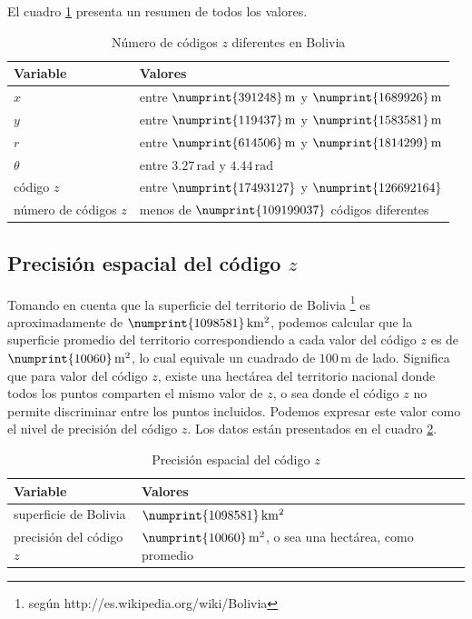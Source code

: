 \documentclass[letterpaper]{article}
\begin{document}
El cuadro \ref{tab:variables} presenta un resumen de todos los valores.

\begin{table}
	\centering
	\begin{tabular}{|l|l|}
		\hline
		Variable & Valores \\
		\hline
		\(x\) & entre \(\numprint{391248}\,\mathrm{m}\) y \(\numprint{1689926}\,\mathrm{m}\) \\
		\(y\) & entre \(\numprint{119437}\,\mathrm{m}\) y \(\numprint{1583581}\,\mathrm{m}\) \\
		\hline
		\(r\) & entre \(\numprint{614506}\,\mathrm{m}\) y \(\numprint{1814299}\,\mathrm{m}\) \\
		\(\theta\) & entre \(3.27\,\mathrm{rad}\) y \(4.44\,\mathrm{rad}\) \\
		\hline
		código \(z\) & entre \(\numprint{17493127}\) y \(\numprint{126692164}\) \\
		número de códigos \(z\) & menos de \(\numprint{109199037}\) códigos diferentes \\
		\hline
	\end{tabular}
	\caption{Número de códigos \(z\) diferentes en Bolivia}
	\label{tab:variables}
\end{table}

\subsection{Precisión espacial del código \(z\)}

Tomando en cuenta que la superficie del territorio de Bolivia 
\footnote{según http://es.wikipedia.org/wiki/Bolivia} es 
aproximadamente de \(\numprint{1098581}\,\mathrm{km^{2}}\), podemos 
calcular que la superficie promedio del territorio correspondiendo a 
cada valor del código \(z\) es de \(\numprint{10060}\,\mathrm{m^{2}}
\), lo cual equivale un cuadrado de \(100\,\mathrm{m}\) de lado. 
Significa que para valor del código \(z\), existe una hectárea del 
territorio nacional donde todos los puntos comparten el mismo valor 
de \(z\), o sea donde el código \(z\) no permite discriminar entre 
los puntos incluidos. Podemos expresar este valor como el nivel de 
precisión del código \(z\). Los datos están presentados en el cuadro 
\ref{tab:precision}.

\begin{table}
	\centering
	\begin{tabular}{|l|l|}
		\hline
		Variable & Valores \\
		\hline
		superficie de Bolivia & \(\numprint{1098581}\,\mathrm{km^{2}}\) \\
		precisión del código  \(z\) & \(\numprint{10060}\,\mathrm{m^{2}}\), o sea una hectárea, como promedio\\
		\hline
	\end{tabular}
	\caption{Precisión espacial del código \(z\)}
	\label{tab:precision}
\end{table}
\end{document}
